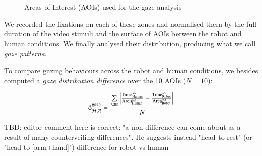 \documentclass[lettersize, noapacite, twoside, HRI]{apa_HRI}
\begin{document}
\begin{figure}
    \centering

    \caption{Areas of Interest (AOIs) used for the gaze analysis}
    \label{fig:aoi}
\end{figure}

We recorded the fixations on each of these zones and normalised them by
the full duration of the video stimuli and the surface of AOIs between the robot
and human conditions. We finally analysed their distribution, producing what we call \emph{gaze
patterns}.

To compare gazing behaviours across the robot and human conditions, we besides
computed a \emph{gaze distribution difference} over the 10 AOIs ($N=10$):

{\Large
\[
    \delta_{\mathcal{H}, \mathcal{R}}^{\text{gaze}} =
    \frac{\sum\limits_{{\text{{\sc aoi}s}}}\left |
    \frac{\text{Time}_{\text{Human}}^{\text{\sc
aoi}}}{\text{Area}_{\text{Human}}^{\text{\sc aoi}}} -
\frac{\text{Time}_{\text{Robot}}^{\text{\sc
aoi}}}{\text{Area}_{\text{Robot}}^{\text{\sc aoi}}} \right |}{N}
\]
}

TBD: editor comment here is correct: "a non-difference can come about as a
result of many counterveiling differences". He suggests instead "head-to-rest"
(or "head-to-[arm+hand]") difference for robot vs human
\end{document}
